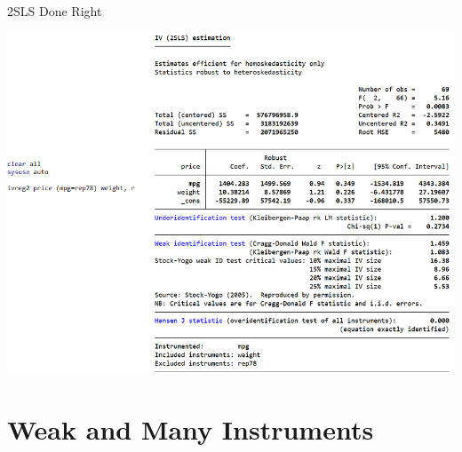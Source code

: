 \documentclass{beamer}
\begin{document}
\begin{frame}{2SLS Done Right }

\vspace{-0.35cm}
\begin{center}
\includegraphics[scale=0.5]{./lecture_includes/auto_iv_results.png}
\end{center}

\end{frame}

\section{Weak and Many Instruments}
\end{document}
